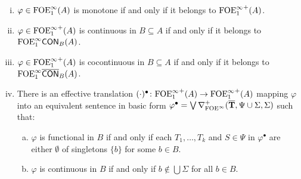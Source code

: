 \begin{theorem} \label{th:ofoei-normalforms} 
\begin{enumerate}[(i)]
\item $\varphi  \in \ofoei(A)$ is monotone if and only if it belongs to ${\ofoei}^{+}(A)$. 
\item $\varphi  \in {\ofoei}^{+}(A)$ is continuous in $B \subseteq A$ if and only if it belongs to $\cont{\ofoei}{B}(A)$. 
\item $\varphi  \in {\ofoei}^{+}(A)$ is cocontinuous in $B \subseteq A$ if and only if it belongs to $\cocont{\ofoei}{B}(A)$. 
\item There is an effective translation $(\cdot)^{\bullet} \: {\ofoei}^{+}(A) \to {\ofoei}^{+}(A)$ mapping $\varphi$ into an equivalent sentence in basic form $\varphi^{\bullet} = \bigvee \mondbnfofoei{\vlist{T}}{\Psi \cup \Sigma}{\Sigma}{+}$ such that:
\begin{enumerate}[(a)]
\item $\varphi$ is functional in $B$ if and only if each $T_1, \dots, T_k$ and $S \in \Psi$ in $\varphi^{\bullet}$ are either $\emptyset$ of singletons $\{b\}$ for some $b \in B$.
\item $\varphi$ is continuous in $B$ if and only if $b\notin \bigcup\Sigma$ for all $b \in B$.
\end{enumerate}
\end{enumerate}
\end{theorem}

